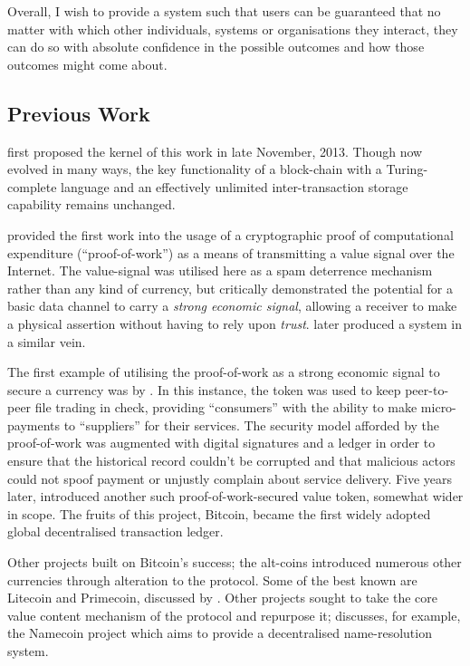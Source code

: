 \documentclass[9pt,oneside]{amsart}
\begin{document}
\begin{multicols}{2}
Overall, I wish to provide a system such that users can be guaranteed that no matter with which other individuals, systems or organisations they interact, they can do so with absolute confidence in the possible outcomes and how those outcomes might come about.

\subsection{Previous Work} \label{ch:previous}

\cite{buterin2013ethereum} first proposed the kernel of this work in late November, 2013. Though now evolved in many ways, the key functionality of a block-chain with a Turing-complete language and an effectively unlimited inter-transaction storage capability remains unchanged.

\cite{dwork92pricingvia} provided the first work into the usage of a cryptographic proof of computational expenditure (``proof-of-work'') as a means of transmitting a value signal over the Internet. The value-signal was utilised here as a spam deterrence mechanism rather than any kind of currency, but critically demonstrated the potential for a basic data channel to carry a \textit{strong economic signal}, allowing a receiver to make a physical assertion without having to rely upon \textit{trust}. \cite{back2002hashcash} later produced a system in a similar vein.

The first example of utilising the proof-of-work as a strong economic signal to secure a currency was by \cite{vishnumurthy03karma:a}. In this instance, the token was used to keep peer-to-peer file trading in check, providing ``consumers'' with the ability to make micro-payments to ``suppliers'' for their services. The security model afforded by the proof-of-work was augmented with digital signatures and a ledger in order to ensure that the historical record couldn't be corrupted and that malicious actors could not spoof payment or unjustly complain about service delivery. Five years later, \cite{nakamoto2008bitcoin} introduced another such proof-of-work-secured value token, somewhat wider in scope. The fruits of this project, Bitcoin, became the first widely adopted global decentralised transaction ledger.

Other projects built on Bitcoin's success; the alt-coins introduced numerous other currencies through alteration to the protocol. Some of the best known are Litecoin and Primecoin, discussed by \cite{sprankel2013technical}. Other projects sought to take the core value content mechanism of the protocol and repurpose it; \cite{aron2012bitcoin} discusses, for example, the Namecoin project which aims to provide a decentralised name-resolution system.


\end{multicols}
\end{document}
